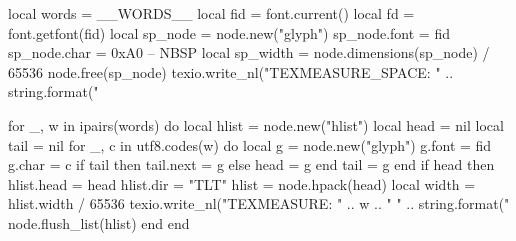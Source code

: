\documentclass{article}
\begin{document}
\fontsize{__FONT_SIZE__pt}{__LEADING__pt}\selectfont

\begin{luacode}
local words = {__WORDS__}
local fid = font.current()
local fd = font.getfont(fid)
local sp_node = node.new("glyph")
sp_node.font = fid
sp_node.char = 0xA0  -- NBSP
local sp_width = node.dimensions(sp_node) / 65536
node.free(sp_node)
texio.write_nl("TEXMEASURE_SPACE: " .. string.format("%

for _, w in ipairs(words) do
  local hlist = node.new("hlist")
  local head = nil
  local tail = nil
  for _, c in utf8.codes(w) do
    local g = node.new("glyph")
    g.font = fid
    g.char = c
    if tail then
      tail.next = g
    else
      head = g
    end
    tail = g
  end
  if head then
    hlist.head = head
    hlist.dir = "TLT"
    hlist = node.hpack(head)
    local width = hlist.width / 65536
    texio.write_nl("TEXMEASURE: " .. w .. " " .. string.format("%
    node.flush_list(hlist)
  end
end
\end{luacode}
\end{document}
